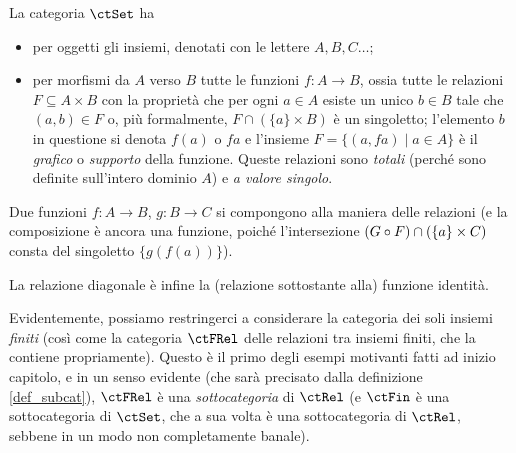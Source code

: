 \begin{example}\label{ex_cat_insiemi}
	La categoria \(\ctSet\) ha
	\begin{itemize}
		\item per oggetti gli insiemi, denotati con le lettere \(A,B,C\dots\);
		\item per morfismi da \(A\) verso \(B\) tutte le funzioni \(f : A\to B\), ossia tutte le relazioni \(F\subseteq A\times B\) con la proprietà che per ogni \(a\in A\) esiste un unico \(b\in B\) tale che \((a,b)\in F\) o, più formalmente, \(F\cap(\{a\}\times B)\) è un singoletto; l'elemento \(b\) in questione si denota \(f(a)\) o \(fa\) e l'insieme \(F = \{(a,fa)\mid a\in A\}\) è il \emph{grafico} o \emph{supporto} della funzione. Queste relazioni sono \emph{totali} (perché sono definite sull'intero dominio \(A\)) e \emph{a valore singolo}.
	\end{itemize}
	Due funzioni \(f : A\to B\), \(g : B\to C\) si compongono alla maniera delle relazioni (e la composizione è ancora una funzione, poiché l'intersezione \((G\circ F)\cap (\{a\}\times C)\) consta del singoletto \(\{g(f(a))\}\)).

	La relazione diagonale è infine la (relazione sottostante alla) funzione identità.
\end{example}
Evidentemente, possiamo restringerci a considerare la categoria dei soli insiemi \emph{finiti} (così come la categoria \(\ctFRel\) delle relazioni tra insiemi finiti, che la contiene propriamente). Questo è il primo degli esempi motivanti fatti ad inizio capitolo, e in un senso evidente (che sarà precisato dalla definizione \ref{def_subcat}), \(\ctFRel\) è una \emph{sottocategoria} di \(\ctRel\) (e \(\ctFin\) è una sottocategoria di \(\ctSet\), che a sua volta è una sottocategoria di \(\ctRel\), sebbene in un modo non completamente banale).
